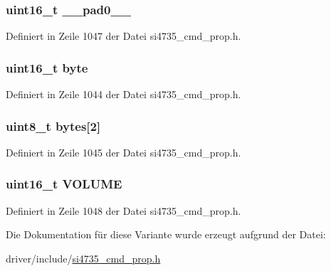 \subsubsection[{\+\_\+\+\_\+pad0\+\_\+\+\_\+}]{\setlength{\rightskip}{0pt plus 5cm}uint16\+\_\+t \+\_\+\+\_\+pad0\+\_\+\+\_\+}\label{unionrx__volume_a77132c2c26a75f5b8751b235cda23828}


Definiert in Zeile 1047 der Datei si4735\+\_\+cmd\+\_\+prop.\+h.

\hypertarget{unionrx__volume_ab0549c1b5ea980a02e7eab77e21fea49}{}
\subsubsection[{byte}]{\setlength{\rightskip}{0pt plus 5cm}uint16\+\_\+t byte}\label{unionrx__volume_ab0549c1b5ea980a02e7eab77e21fea49}


Definiert in Zeile 1044 der Datei si4735\+\_\+cmd\+\_\+prop.\+h.

\hypertarget{unionrx__volume_a46e4c05d20a047ec169f60d3167e912e}{}
\subsubsection[{bytes}]{\setlength{\rightskip}{0pt plus 5cm}uint8\+\_\+t bytes\mbox{[}2\mbox{]}}\label{unionrx__volume_a46e4c05d20a047ec169f60d3167e912e}


Definiert in Zeile 1045 der Datei si4735\+\_\+cmd\+\_\+prop.\+h.

\hypertarget{unionrx__volume_a03739146af570e536bfcb72ec21ffee9}{}
\subsubsection[{V\+O\+L\+U\+M\+E}]{\setlength{\rightskip}{0pt plus 5cm}uint16\+\_\+t V\+O\+L\+U\+M\+E}\label{unionrx__volume_a03739146af570e536bfcb72ec21ffee9}


Definiert in Zeile 1048 der Datei si4735\+\_\+cmd\+\_\+prop.\+h.



Die Dokumentation für diese Variante wurde erzeugt aufgrund der Datei\+:\begin{DoxyCompactItemize}
\item 
driver/include/\hyperlink{si4735__cmd__prop_8h}{si4735\+\_\+cmd\+\_\+prop.\+h}\end{DoxyCompactItemize}
